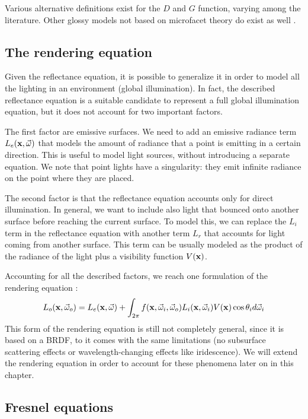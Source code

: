 Various alternative definitions exist for the $D$ and $G$ function, varying among the literature. Other glossy models not based on microfacet theory do exist as well \citep{RTR3}. 

\subsection{The rendering equation}

Given the reflectance equation, it is possible to generalize it in order to model all the lighting in an environment (global illumination). In fact, the described reflectance equation is a suitable candidate to represent a full global illumination equation, but it does not account for two important factors. 

The first factor are emissive surfaces. We need to add an emissive radiance term $L_e(\mathbf{x}, \vec{\omega})$ that models the amount of radiance that a point is emitting in a certain direction. This is useful to model light sources, without introducing a separate equation. We note that point lights have a singularity: they emit infinite radiance on the point where they are placed.

The second factor is that the reflectance equation accounts only for direct illumination. In general, we want to include also light that bounced onto another surface before reaching the current surface. To model this, we can replace the $L_i$ term in the reflectance equation with another term $L_r$ that accounts for light coming from another surface. This term can be usually modeled as the product of the radiance of the light plus a visibility function $V(\mathbf{x})$.

Accounting for all the described factors, we reach one formulation of the rendering equation \citep{Kajiya:1986:RE:15886.15902}:
$$
L_o(\mathbf{x}, \vec{\omega}_o) = L_e(\mathbf{x}, \vec{\omega}) + \int_{2\pi} f(\mathbf{x}, \vec{\omega}_i, \vec{\omega}_o) L_i(\mathbf{x}, \vec{\omega}_i) V(\mathbf{x}) \cos\theta_i d\vec{\omega}_i
$$
This form of the rendering equation is still not completely general, since it is based on a BRDF, to it comes with the same limitations (no subsurface scattering effects or wavelength-changing effects like iridescence). We will extend the rendering equation in order to account for these phenomena later on in this chapter.

\subsection{Fresnel equations}
\label{sec:fresnel}

